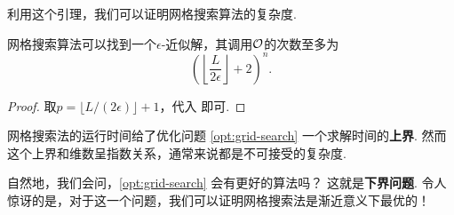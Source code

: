 利用这个引理，我们可以证明网格搜索算法的复杂度.
\begin{theorem}
    网格搜索算法可以找到一个$\epsilon$-近似解，其调用$\mathcal{O}$的次数至多为
    \[\left(\left\lfloor\frac{L}{2\epsilon}\right\rfloor+2\right)^n.\]
\end{theorem}
\begin{proof}
    取$p=\lfloor L/(2\epsilon)\rfloor+1$，代入 即可.
\end{proof}

网格搜索法的运行时间给了优化问题 \eqref{opt:grid-search} 一个求解时间的\textbf{上界}. 然而这个上界和维数呈指数关系，通常来说都是不可接受的复杂度. 

自然地，我们会问，\eqref{opt:grid-search} 会有更好的算法吗？ 这就是\textbf{下界问题}. 令人惊讶的是，对于这一个问题，我们可以证明网格搜索法是渐近意义下最优的！

